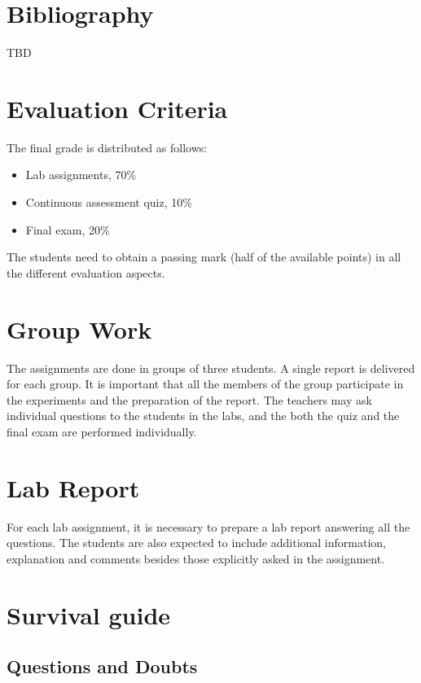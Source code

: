 \section{Bibliography}

TBD

\section{Evaluation Criteria}

The final grade is distributed as follows:
\begin{itemize}
\item Lab assignments, 70\%
\item Continuous assessment quiz, 10\%
\item Final exam, 20\%
\end{itemize}

The students need to obtain a passing mark (half of the available points) in all the different evaluation aspects.

\section{Group Work}

The assignments are done in groups of three students.
A single report is delivered for each group.
It is important that all the members of the group participate in the experiments and the preparation of the report.
The teachers may ask individual questions to the students in the labs, and the both the quiz and the final exam are performed individually.

\section{Lab Report}

For each lab assignment, it is necessary to prepare a lab report answering all the questions. The students are also expected to include additional information, explanation and comments besides those explicitly asked in the assignment.

\section{Survival guide}

\subsection{Questions and Doubts}

